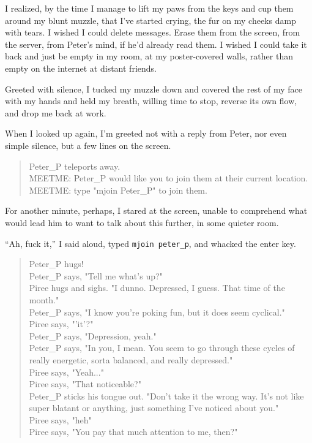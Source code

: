 I realized, by the time I manage to lift my paws from the keys and cup them around my blunt muzzle, that I've started crying, the fur on my cheeks damp with tears. I wished I could delete messages. Erase them from the screen, from the server, from Peter's mind, if he'd already read them. I wished I could take it back and just be empty in my room, at my poster-covered walls, rather than empty on the internet at distant friends.

Greeted with silence, I tucked my muzzle down and covered the rest of my face with my hands and held my breath, willing time to stop, reverse its own flow, and drop me back at work.

When I looked up again, I'm greeted not with a reply from Peter, nor even simple silence, but a few lines on the screen.

\begin{verse}
    {\ttfamily
Peter\_P teleports away.\\
MEETME: Peter\_P would like you to join them at their current location.\\
MEETME: type "mjoin Peter\_P" to join them.}
\end{verse}

For another minute, perhaps, I stared at the screen, unable to comprehend what would lead him to want to talk about this further, in some quieter room.

``Ah, fuck it,'' I said aloud, typed \texttt{mjoin\ peter\_p}, and whacked the enter key.

\begin{verse}
    {\ttfamily
Peter\_P hugs!\\
Peter\_P says, "Tell me what's up?"\\
Piree hugs and sighs. "I dunno. Depressed, I guess. That time of the month."\\
Peter\_P says, "I know you're poking fun, but it does seem cyclical."\\
Piree says, "'it'?"\\
Peter\_P says, "Depression, yeah."\\
Peter\_P says, "In you, I mean. You seem to go through these cycles of really energetic, sorta balanced, and really depressed."\\
Piree says, "Yeah..."\\
Piree says, "That noticeable?"\\
Peter\_P sticks his tongue out. "Don't take it the wrong way. It's not like super blatant or anything, just something I've noticed about you."\\
Piree says, "heh"\\
Piree says, "You pay that much attention to me, then?"}
\end{verse}

